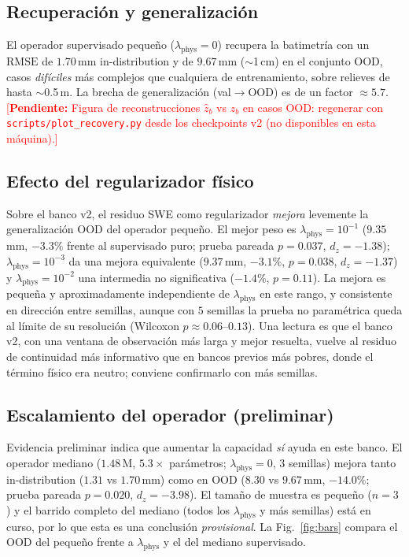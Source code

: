 \documentclass[conference]{IEEEtran}
\newcommand{\zb}{z_b}
\newcommand{\RMSE}{\mathrm{RMSE}}
\newcommand{\TODO}[1]{\textcolor{red}{[\textbf{Pendiente:} #1]}}
\begin{document}
\subsection{Recuperación y generalización}
El operador supervisado pequeño ($\lambda_{\text{phys}}=0$) recupera la
batimetría con un $\RMSE$ de $1.70$\,mm in-distribution y de $9.67$\,mm
($\sim$1\,cm) en el conjunto OOD, casos \emph{difíciles} más complejos que
cualquiera de entrenamiento, sobre relieves de hasta $\sim$0.5\,m. La brecha de
generalización (val$\to$OOD) es de un factor $\approx 5.7$.
\TODO{Figura de reconstrucciones $\hat\zb$ vs $\zb$ en casos OOD: regenerar con
\texttt{scripts/plot\_recovery.py} desde los checkpoints v2 (no disponibles en
esta máquina).}

\subsection{Efecto del regularizador físico}
Sobre el banco v2, el residuo SWE como regularizador \emph{mejora} levemente la
generalización OOD del operador pequeño. El mejor peso es
$\lambda_{\text{phys}}=10^{-1}$ ($9.35$\,mm, $-3.3\%$ frente al supervisado
puro; prueba pareada $p=0.037$, $d_z=-1.38$); $\lambda_{\text{phys}}=10^{-3}$
da una mejora equivalente ($9.37$\,mm, $-3.1\%$, $p=0.038$, $d_z=-1.37$) y
$\lambda_{\text{phys}}=10^{-2}$ una intermedia no significativa ($-1.4\%$,
$p=0.11$). La mejora es pequeña y aproximadamente independiente de
$\lambda_{\text{phys}}$ en este rango, y consistente en dirección entre
semillas, aunque con $5$ semillas la prueba no paramétrica queda al límite de
su resolución (Wilcoxon $p\approx0.06$--$0.13$). Una lectura es que el banco v2,
con una ventana de observación más larga y mejor resuelta, vuelve al residuo de
continuidad más informativo que en bancos previos más pobres, donde el término
físico era neutro; conviene confirmarlo con más semillas.

\subsection{Escalamiento del operador (preliminar)}
Evidencia preliminar indica que aumentar la capacidad \emph{sí} ayuda en este
banco. El operador mediano ($1.48$\,M, $5.3\times$ parámetros;
$\lambda_{\text{phys}}=0$, $3$ semillas) mejora tanto in-distribution
($1.31$ vs $1.70$\,mm) como en OOD ($8.30$ vs $9.67$\,mm, $-14.0\%$; prueba
pareada $p=0.020$, $d_z=-3.98$). El tamaño de muestra es pequeño ($n=3$) y el
barrido completo del mediano (todos los $\lambda_{\text{phys}}$ y más semillas)
está en curso, por lo que esta es una conclusión \emph{provisional}. La
Fig.~\ref{fig:bars} compara el OOD del pequeño frente a $\lambda_{\text{phys}}$
y el del mediano supervisado.
\end{document}
